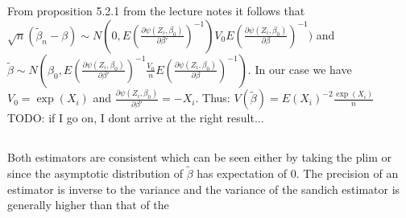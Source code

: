 \documentclass[11pt]{article}
\theoremstyle{break}
\begin{document}
\subsection{}
From proposition 5.2.1 from the lecture notes it follows that $\sqrt{n}(\tilde{\beta}_n-\beta) \sim N(0, E(\frac{\partial \psi(Z_i, \beta_0)}{\partial \beta'})^{-1})V_0 E(\frac{\partial \psi(Z_i, \beta_0)}{\partial \beta})^{-1})$
and $\tilde{\beta} \sim N(\beta_0, E(\frac{\partial \psi(Z_i, \beta_0)}{\partial \beta'})^{-1}\frac{V_0}{n} E(\frac{\partial \psi(Z_i, \beta_0)}{\partial \beta})^{-1})$. In our case we have $V_0 = \exp(X_i)$ and $\frac{\partial \psi(Z_i, \beta_0)}{\partial \beta'} = -X_i$. Thus:
$V(\tilde{\beta}) = E(X_i)^{-2}\frac{\exp(X_i)}{n}$ TODO: if I go on, I dont arrive at the right result...

\subsection{}
Both estimators are consistent which can be seen either by taking the plim or since the asymptotic distribution of $\tilde{\beta}$ has expectation of 0. The precision of an estimator is inverse to the variance and the variance of the sandich estimator is generally higher than that of the 
\end{document}
